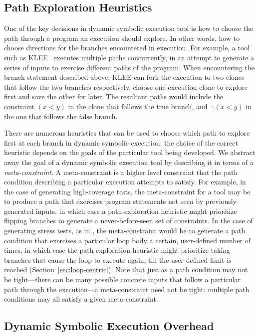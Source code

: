 \subsection{Path Exploration Heuristics}

One of the key decisions in dynamic symbolic execution tool is how to choose
the path through a program an execution should explore. In other words, how to
choose directions for the branches encountered in execution. For example, a
tool such as KLEE~\cite{klee} executes multiple paths concurrently, in an attempt to
generate a series of inputs to exercise different paths of the program.
When encountering the branch statement described above, KLEE can fork the
execution to two clones that follow the two branches respectively, choose one
execution clone to explore first and save the other for later. The resultant
paths would include the constraint $(x < y)$ in the clone that follows the true
branch, and $\neg(x < y)$ in the one that follows the false
branch.


There are numerous heuristics that can be used to choose which path
to explore first at each branch in dynamic symbolic execution; the choice of the
correct heuristic depends on the goals of the particular tool being developed.
We abstract away the goal of a dynamic symbolic execution tool by describing
it in terms of a {\em meta-constraint}. A meta-constraint is a higher level
constraint that the path condition describing a particular execution
attempts to satisfy. For example, in the case of generating high-coverage
tests, the meta-constraint for a tool may be to produce a path that exercises
program statements not seen by previously-generated inputs, in which case a
path-exploration heuristic might prioritize flipping branches to generate a
never-before-seen set of constraints. In the case of generating stress tests,
as in \lancet, the meta-constraint would be to generate a path condition
that exercises a particular loop body a certain, user-defined number of times, in which case
the path-exploration heuristic might prioritize taking branches that cause the
loop to execute again, till the user-defined limit is reached 
(Section~\ref{sec:loop-centric}). Note that just
as a path condition may not be tight---there can be many possible
concrete inputs that follow a particular path through the execution---a
meta-constraint need not be tight: multiple path conditions may all
satisfy a given meta-constraint.

\subsection{Dynamic Symbolic Execution Overhead}

